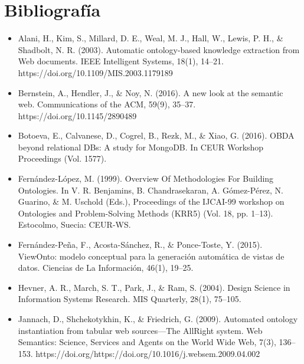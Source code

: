 \chapter*{\Large Bibliografía}


\pagestyle{fancy}
\renewcommand{\sectionmark}[1]{\markright{#1}}

\lhead{}
\chead{}
\lfoot{}
\cfoot{}
\rfoot{\thepage}
\renewcommand{\headrulewidth}{0.4pt}

\begin{itemize}
\item Alani, H., Kim, S., Millard, D. E., Weal, M. J., Hall, W., Lewis, P. H., \& Shadbolt, N. R. (2003). Automatic ontology-based knowledge extraction from Web documents. IEEE Intelligent Systems, 18(1), 14–21. https://doi.org/10.1109/MIS.2003.1179189

\item Bernstein, A., Hendler, J., \& Noy, N. (2016). A new look at the semantic web. Communications of the ACM, 59(9), 35–37. https://doi.org/10.1145/2890489

\item Botoeva, E., Calvanese, D., Cogrel, B., Rezk, M., \& Xiao, G. (2016). OBDA beyond relational DBs: A study for MongoDB. In CEUR Workshop Proceedings (Vol. 1577).

\item Fernández-López, M. (1999). Overview Of Methodologies For Building Ontologies. In V. R. Benjamins, B. Chandrasekaran, A. Gómez-Pérez, N. Guarino, \& M. Uschold (Eds.), Proceedings of the IJCAI-99 workshop on Ontologies and Problem-Solving Methods (KRR5) (Vol. 18, pp. 1–13). Estocolmo, Suecia: CEUR-WS.

\item Fernández-Peña, F., Acosta-Sánchez, R., \& Ponce-Toste, Y. (2015). ViewOnto: modelo conceptual para la generación automática de vistas de datos. Ciencias de La Información, 46(1), 19–25.

\item Hevner, A. R., March, S. T., Park, J., \& Ram, S. (2004). Design Science in Information Systems Research. MIS Quarterly, 28(1), 75–105.

\item Jannach, D., Shchekotykhin, K., \& Friedrich, G. (2009). Automated ontology instantiation from tabular web sources—The AllRight system. Web Semantics: Science, Services and Agents on the World Wide Web, 7(3), 136–153. https://doi.org/https://doi.org/10.1016/j.websem.2009.04.002


\end{itemize}
